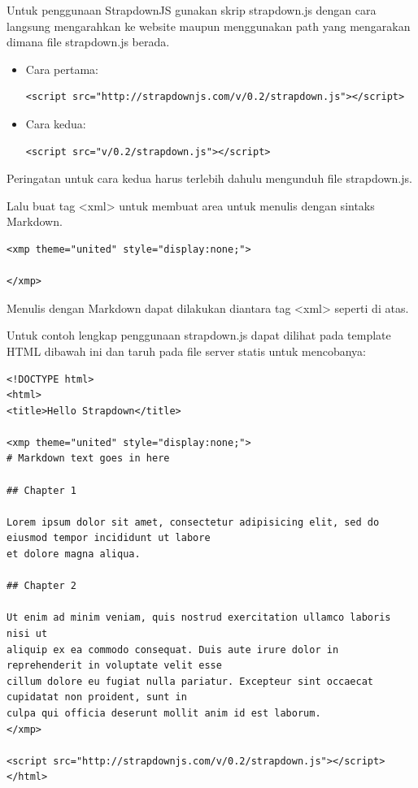 \begin{enumerate}
Untuk penggunaan StrapdownJS gunakan skrip strapdown.js dengan cara langsung mengarahkan ke website maupun menggunakan path yang mengarakan dimana file strapdown.js berada.
\begin{itemize}
\item Cara pertama:\\
\begin{lstlisting}
<script src="http://strapdownjs.com/v/0.2/strapdown.js"></script>
\end{lstlisting}
\item Cara kedua:\\
\begin{lstlisting}
<script src="v/0.2/strapdown.js"></script>
\end{lstlisting}
\end{itemize}

Peringatan untuk cara kedua harus terlebih dahulu mengunduh file strapdown.js.

Lalu buat tag <xml> untuk membuat area untuk menulis dengan sintaks Markdown.
\begin{lstlisting}
<xmp theme="united" style="display:none;">

</xmp>
\end{lstlisting}
Menulis dengan Markdown dapat dilakukan diantara  tag <xml> seperti di atas.

Untuk contoh lengkap penggunaan strapdown.js dapat dilihat pada template HTML dibawah ini dan taruh pada file server statis untuk mencobanya:
\begin{lstlisting}
<!DOCTYPE html>
<html>
<title>Hello Strapdown</title>

<xmp theme="united" style="display:none;">
# Markdown text goes in here

## Chapter 1

Lorem ipsum dolor sit amet, consectetur adipisicing elit, sed do eiusmod tempor incididunt ut labore
et dolore magna aliqua. 

## Chapter 2

Ut enim ad minim veniam, quis nostrud exercitation ullamco laboris nisi ut
aliquip ex ea commodo consequat. Duis aute irure dolor in reprehenderit in voluptate velit esse
cillum dolore eu fugiat nulla pariatur. Excepteur sint occaecat cupidatat non proident, sunt in
culpa qui officia deserunt mollit anim id est laborum.
</xmp>

<script src="http://strapdownjs.com/v/0.2/strapdown.js"></script>
</html>
\end{lstlisting}


\end{enumerate}
